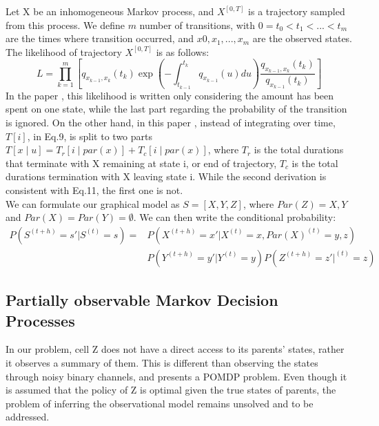 \documentclass[]{article}
\begin{document}
Let X be an inhomogeneous Markov process, and $  X^{\left[0,T\right] } $ is a trajectory sampled from this process. We define $ m $ number of transitions, with $ 0 = t_{0} < t_{1} < ... < t_{m} $ are the times where transition occurred, and $ x{0}, x_{1},...,x_{m} $ are the observed states. The likelihood of trajectory  $  X^{\left[0,T\right] } $ is  as follows: 
\begin{equation}
L= \prod_{k=1}^{m} \left[ q_{x_{k-1}, x_{k}} (t_{k}) \exp \left(-\int_{t_{k-1}}^{t_{k}} q_{x_{k-1}}(u) d u\right) \frac{q_{x_{k-1}, x_{k}} (t_{k})}{q_{x_{k-1}}(t_{k})}\right] 
\end{equation}
In the paper \cite{Perez-Ocon2000}, this likelihood is written only considering the amount has been spent on one state, while the last part regarding the probability of the transition is ignored. On the other hand, in this paper \cite{Nodelman2014}, instead of integrating over time, $ T[i] $, in Eq.9, is split to two parts $ T[x\mid u] = T_{r}[i\mid par(x)] + T_{c}[i\mid par(x)] $, where $ T_{r}  $ is the total durations that terminate with X remaining at state i, or end of trajectory, $ T_{c} $ is the total durations termination with X leaving state i. While the second derivation is consistent with Eq.11, the first one is not.\\

We can formulate our graphical model as $ S = [X, Y, Z] $, where $ Par(Z) = {X,Y} $ and $ Par(X) = Par(Y) =\emptyset $. We can then write the conditional probability:
\begin{equation}
\begin{split}
P\left(S^{\left(t+h\right)}=s' | S^{\left(t\right)}=s\right) = & P\left(X^{\left( t+h\right) }=x' | X^{\left(t\right)}=x, Par(X)^{\left(t\right)}={y,z}\right) \\&  P\left(Y^{\left( t+h\right) }=y' | Y^{\left(t\right)}=y\right) P\left(Z^{\left( t+h\right) }=z' | ^{\left(t\right)}=z\right)
\end{split} 
\end{equation}

\subsection{Partially observable Markov Decision Processes}
In our problem, cell Z does not have a direct access to its parents' states, rather it observes a summary of them. This is different than observing the states through noisy binary channels, and presents a POMDP problem. Even though it is assumed that the policy of Z is optimal given the true states of parents, the problem of inferring the observational model remains unsolved and to be addressed.
\end{document}
